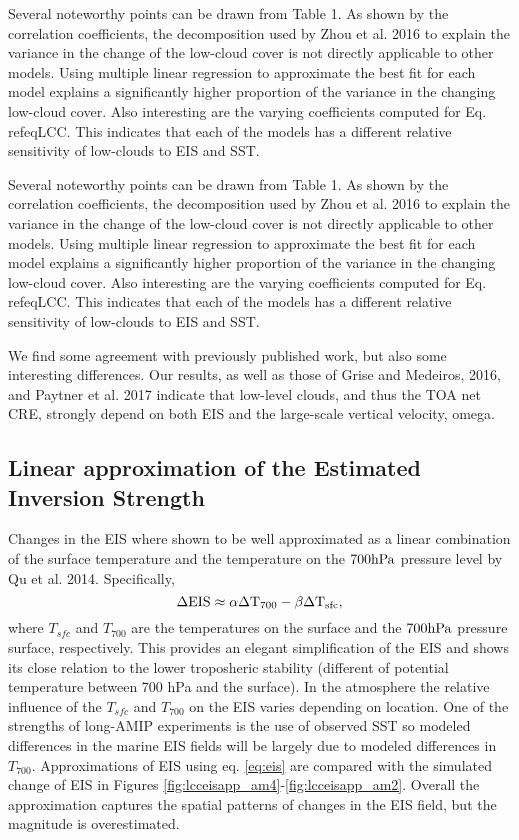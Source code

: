 \documentclass[grl]{agutex2015}
\begin{document}
\begin{article}
Several noteworthy points can be drawn from Table 1.  As shown by the correlation coefficients, the decomposition used by Zhou et al. 2016 to explain the variance in the change of the low-cloud cover is not directly applicable to other models.  Using multiple linear regression to approximate the best fit for each model explains a significantly higher proportion of the variance in the changing low-cloud cover.  Also interesting are the varying coefficients computed for Eq. ref{eqLCC}.  This indicates that each of the models has a different relative sensitivity of low-clouds to EIS and SST.   

Several noteworthy points can be drawn from Table 1.  As shown by the correlation coefficients, the decomposition used by Zhou et al. 2016 to explain the variance in the change of the low-cloud cover is not directly applicable to other models.  Using multiple linear regression to approximate the best fit for each model explains a significantly higher proportion of the variance in the changing low-cloud cover.  Also interesting are the varying coefficients computed for Eq. ref{eqLCC}.  This indicates that each of the models has a different relative sensitivity of low-clouds to EIS and SST.   

    
We find some agreement with previously published work, but also some interesting differences.  Our results, as well as those of Grise and Medeiros, 2016, and Paytner et al. 2017 indicate that low-level clouds, and thus the TOA net CRE, strongly depend on both EIS and the large-scale vertical velocity, omega.     

\subsection{Linear approximation of the Estimated Inversion Strength}

Changes in the EIS where shown to be well approximated as a linear combination of the surface temperature and the temperature on the $700 \rm{hPa}$ pressure level by Qu et al. 2014.  Specifically,
\begin{equation}
  \Delta \rm{EIS} \approx \alpha \Delta T_{700}-\beta \Delta T_{sfc},
  \label{eq:eis}
\end{equation}
where $T_{sfc}$ and $T_{700}$ are the temperatures on the surface and the $700 \rm{hPa}$ pressure surface, respectively.
This provides an elegant simplification of the EIS and shows its close relation to the lower troposheric stability (different of potential temperature between 700 hPa and the surface).  In the atmosphere the relative influence of the $T_{sfc}$ and $T_{700}$ on the EIS varies depending on location.  One of the strengths of long-AMIP experiments is the use of observed SST so modeled differences in the marine EIS fields will be largely due to modeled differences in $T_{700}$.  Approximations of EIS using eq. \ref{eq:eis} are compared with the simulated change of EIS in Figures \ref{fig:lcceisapp_am4}-\ref{fig:lcceisapp_am2}.  Overall the approximation captures the spatial patterns of changes in the EIS field, but the magnitude is overestimated.  


\end{article}
\end{document}
